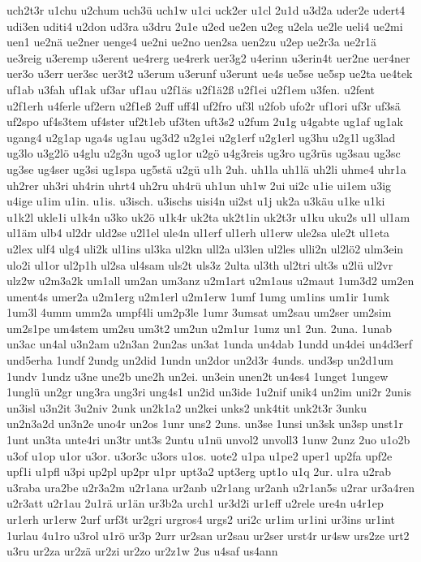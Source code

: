 {uch2t3r
u1chu
u2chum
uch3ü
uch1w
u1ci
uck2er
u1cl
2u1d
u3d2a
uder2e
udert4
udi3en
uditi4
u2don
ud3ra
u3dru
2u1e
u2ed
ue2en
u2eg
u2ela
ue2le
ueli4
ue2mi
uen1
ue2nä
ue2ner
uenge4
ue2ni
ue2no
uen2sa
uen2zu
u2ep
ue2r3a
ue2r1ä
ue3reig
u3eremp
u3erent
ue4rerg
ue4rerk
uer3g2
u4erinn
u3erin4t
uer2ne
uer4ner
uer3o
u3err
uer3sc
uer3t2
u3erum
u3erunf
u3erunt
ue4s
ue5se
ue5sp
ue2ta
ue4tek
uf1ab
u3fah
uf1ak
uf3ar
uf1au
u2f1äs
u2f1ä2ß
u2f1ei
u2f1em
u3fen.
u2fent
u2f1erh
u4ferle
uf2ern
u2f1eß
2uff
uff4l
uf2fro
uf3l
u2fob
ufo2r
uf1ori
uf3r
uf3sä
uf2spo
uf4s3tem
uf4ster
uf2t1eb
uf3ten
uft3s2
u2fum
2u1g
u4gabte
ug1af
ug1ak
ugang4
u2g1ap
uga4s
ug1au
ug3d2
u2g1ei
u2g1erf
u2g1erl
ug3hu
u2g1l
ug3lad
ug3lo
u3g2lö
u4glu
u2g3n
ugo3
ug1or
u2gö
u4g3reis
ug3ro
ug3rüs
ug3sau
ug3sc
ug3se
ug4ser
ug3si
ug1spa
ug5stä
u2gü
u1h
2uh.
uh1la
uh1lä
uh2li
uhme4
uhr1a
uh2rer
uh3ri
uh4rin
uhrt4
uh2ru
uh4rü
uh1un
uh1w
2ui
ui2c
u1ie
ui1em
u3ig
u4ige
u1im
u1in.
u1is.
u3isch.
u3ischs
uisi4n
ui2st
u1j
uk2a
u3käu
u1ke
u1ki
u1k2l
ukle1i
u1k4n
u3ko
uk2ö
u1k4r
uk2ta
uk2t1in
uk2t3r
u1ku
uku2s
u1l
ul1am
ul1äm
ulb4
ul2dr
uld2se
u2l1el
ule4n
ul1erf
ul1erh
ul1erw
ule2sa
ule2t
ul1eta
u2lex
ulf4
ulg4
uli2k
ul1ins
ul3ka
ul2kn
ull2a
ul3len
ul2les
ulli2n
ul2lö2
ulm3ein
ulo2i
ul1or
ul2p1h
ul2sa
ul4sam
uls2t
uls3z
2ulta
ul3th
ul2tri
ult3s
u2lü
ul2vr
ulz2w
u2m3a2k
um1all
um2an
um3anz
u2m1art
u2m1aus
u2maut
1um3d2
um2en
ument4s
umer2a
u2m1erg
u2m1erl
u2m1erw
1umf
1umg
um1ins
um1ir
1umk
1um3l
4umm
umm2a
umpf4li
um2p3le
1umr
3umsat
um2sau
um2ser
um2sim
um2s1pe
um4stem
um2su
um3t2
um2un
u2m1ur
1umz
un1
2un.
2una.
1unab
un3ac
un4al
u3n2am
u2n3an
2un2as
un3at
1unda
un4dab
1undd
un4dei
un4d3erf
und5erha
1undf
2undg
un2did
1undn
un2dor
un2d3r
4unds.
und3sp
un2d1um
1undv
1undz
u3ne
une2b
une2h
un2ei.
un3ein
unen2t
un4es4
1unget
1ungew
1unglü
un2gr
ung3ra
ung3ri
ung4s1
un2id
un3ide
1u2nif
unik4
un2im
uni2r
2unis
un3isl
u3n2it
3u2niv
2unk
un2k1a2
un2kei
unks2
unk4tit
unk2t3r
3unku
un2n3a2d
un3n2e
uno4r
un2os
1unr
uns2
2uns.
un3se
1unsi
un3sk
un3sp
unst1r
1unt
un3ta
unte4ri
un3tr
unt3s
2untu
u1nü
unvol2
unvoll3
1unw
2unz
2uo
u1o2b
u3of
u1op
u1or
u3or.
u3or3c
u3ors
u1os.
uote2
u1pa
u1pe2
uper1
up2fa
upf2e
upf1i
u1pfl
u3pi
up2pl
up2pr
u1pr
upt3a2
upt3erg
upt1o
u1q
2ur.
u1ra
u2rab
u3raba
ura2be
u2r3a2m
u2r1ana
ur2anb
u2r1ang
ur2anh
u2r1an5s
u2rar
ur3a4ren
u2r3att
u2r1au
2u1rä
ur1än
ur3b2a
urch1
ur3d2i
ur1eff
u2rele
ure4n
u4r1ep
ur1erh
ur1erw
2urf
urf3t
ur2gri
urgros4
urgs2
uri2c
ur1im
ur1ini
ur3ins
ur1int
1urlau
4u1ro
u3rol
u1rö
ur3p
2urr
ur2san
ur2sau
ur2ser
urst4r
ur4sw
urs2ze
urt2
u3ru
ur2za
ur2zä
ur2zi
ur2zo
ur2z1w
2us
u4saf
us4ann
}
